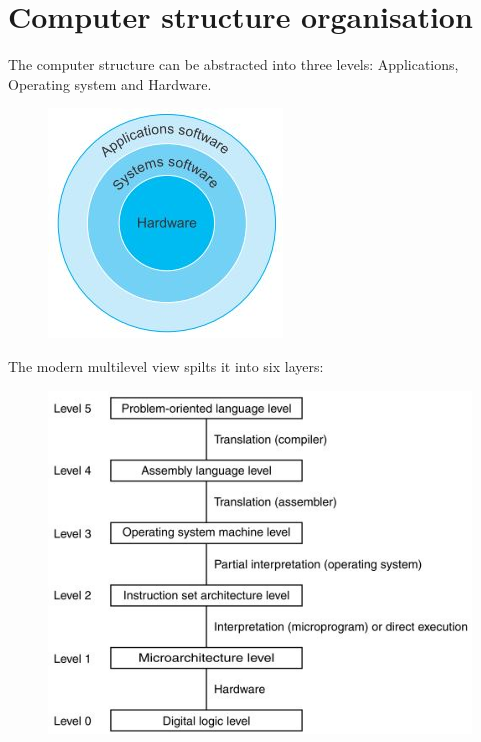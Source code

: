 \documentclass[10pt,a4paper]{article}
\begin{document}
\section{Computer structure organisation}

The computer structure can be abstracted into three levels: Applications, Operating system and
Hardware. \par
\begin{figure} [h!]
    \centering
    \includegraphics[scale=0.7]{Three layer.JPG}
\end{figure}
The modern multilevel view spilts it into six layers:
\begin{figure} [h!]
    \centering
    \includegraphics[scale=0.8]{Six layer.JPG}
\end{figure}
\end{document}
